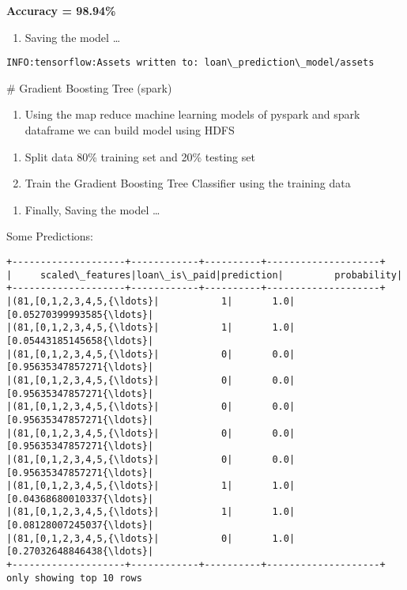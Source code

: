 \documentclass[11pt]{article}
\providecommand{\tightlist}{%
      \setlength{\itemsep}{0pt}\setlength{\parskip}{0pt}}
\begin{document}
    \textbf{Accuracy = 98.94\%}

    \begin{enumerate}
\def\labelenumi{\arabic{enumi}.}
\setcounter{enumi}{5}
\tightlist
\item
  Saving the model \ldots{}
\end{enumerate}

    \begin{Verbatim}[commandchars=\\\{\}]
INFO:tensorflow:Assets written to: loan\_prediction\_model/assets
    \end{Verbatim}

    \# Gradient Boosting Tree (spark)

    \begin{enumerate}
\def\labelenumi{\arabic{enumi}.}
\tightlist
\item
  Using the map reduce machine learning models of pyspark and spark
  dataframe we can build model using HDFS
\end{enumerate}

    \begin{enumerate}
\def\labelenumi{\arabic{enumi}.}
\setcounter{enumi}{1}
\tightlist
\item
  Split data 80\% training set and 20\% testing set
\item
  Train the Gradient Boosting Tree Classifier using the training data
\end{enumerate}

    \begin{enumerate}
\def\labelenumi{\arabic{enumi}.}
\setcounter{enumi}{3}
\tightlist
\item
  Finally, Saving the model \ldots{}
\end{enumerate}

    Some Predictions:

    \begin{Verbatim}[commandchars=\\\{\}]
+--------------------+------------+----------+--------------------+
|     scaled\_features|loan\_is\_paid|prediction|         probability|
+--------------------+------------+----------+--------------------+
|(81,[0,1,2,3,4,5,{\ldots}|           1|       1.0|[0.05270399993585{\ldots}|
|(81,[0,1,2,3,4,5,{\ldots}|           1|       1.0|[0.05443185145658{\ldots}|
|(81,[0,1,2,3,4,5,{\ldots}|           0|       0.0|[0.95635347857271{\ldots}|
|(81,[0,1,2,3,4,5,{\ldots}|           0|       0.0|[0.95635347857271{\ldots}|
|(81,[0,1,2,3,4,5,{\ldots}|           0|       0.0|[0.95635347857271{\ldots}|
|(81,[0,1,2,3,4,5,{\ldots}|           0|       0.0|[0.95635347857271{\ldots}|
|(81,[0,1,2,3,4,5,{\ldots}|           0|       0.0|[0.95635347857271{\ldots}|
|(81,[0,1,2,3,4,5,{\ldots}|           1|       1.0|[0.04368680010337{\ldots}|
|(81,[0,1,2,3,4,5,{\ldots}|           1|       1.0|[0.08128007245037{\ldots}|
|(81,[0,1,2,3,4,5,{\ldots}|           0|       1.0|[0.27032648846438{\ldots}|
+--------------------+------------+----------+--------------------+
only showing top 10 rows

    \end{Verbatim}
\end{document}
